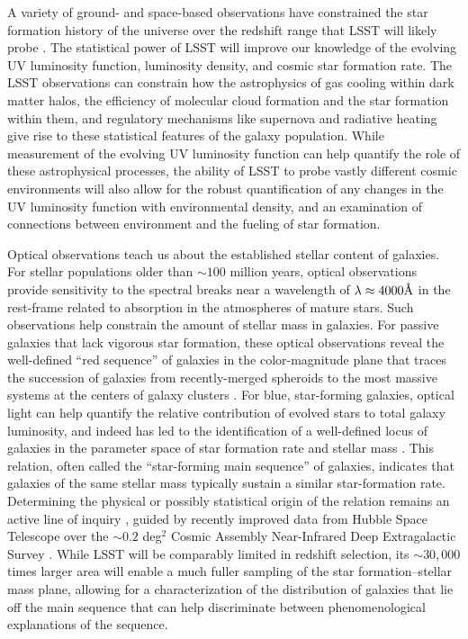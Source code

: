 {A variety of ground- and space-based observations
have constrained the
star formation history of the universe over the
redshift range that LSST will likely probe
\citep[for a recent review, see][]{madau2014a}.
The statistical power of LSST will improve our
knowledge of the evolving UV luminosity function,
luminosity density, and cosmic
star formation rate. The LSST observations can
constrain how the astrophysics of gas
cooling within dark matter halos, the efficiency
of molecular cloud formation and the star formation
within them, and
regulatory mechanisms like supernova and radiative
heating give rise to these statistical features
of the galaxy population. While measurement of
the evolving UV luminosity function can
help quantify the role of these 
astrophysical processes, the ability of LSST
to probe vastly different cosmic environments
will also allow for the robust quantification of any
changes in the UV luminosity function with
environmental density, and an examination of 
connections between environment and the fueling
of star formation.

Optical observations teach us about
the established stellar content of galaxies.  
For stellar populations older than $\sim100$ million
years, optical observations provide 
sensitivity to the spectral breaks near a
wavelength of $\lambda\approx4000\mbox{\normalfont\AA}$ in the 
rest-frame related to absorption in the
atmospheres of mature stars. 
Such observations help constrain
the amount of stellar mass in galaxies. For
passive galaxies that lack vigorous star formation,
these optical observations reveal
the well-defined ``red sequence'' of
galaxies in the color-magnitude plane
that traces the succession of
galaxies from recently-merged spheroids
to the most massive systems at the
centers of galaxy clusters \citep[e.g.][]{kaviraj2005a}. For blue,
star-forming
galaxies, optical light can help
quantify the relative contribution of
evolved stars to total galaxy luminosity, 
and indeed has
led to the identification of a well-defined
locus of galaxies in the parameter space of
star formation rate and stellar mass 
\citep[e.g.,][]{noeske2007a}. This
relation, often called the ``star-forming
main sequence'' of galaxies, indicates that
galaxies of the same stellar mass typically
sustain a similar star-formation rate. 
Determining the
physical or possibly statistical 
origin of the relation remains an active
line of inquiry \citep[e.g.][]{lofthouse2017a}, guided by recently improved
data from Hubble Space Telescope over the
$\sim0.2$ deg$^{2}$ Cosmic Assembly Near-Infrared
Deep Extragalactic Survey 
\citep{grogin2011a,koekemoer2011a}. While 
LSST will be comparably limited in redshift 
selection, its $\sim30,000$ times larger area
will enable a much fuller sampling of the
star formation--stellar mass plane, allowing
for a characterization of the distribution
of galaxies that lie off the main sequence
that can help discriminate between phenomenological
explanations of the sequence.

}
